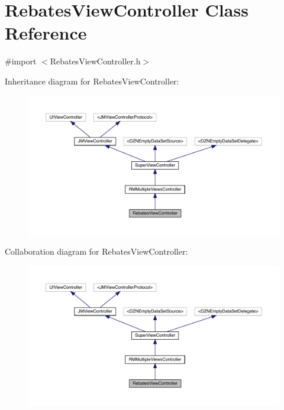\hypertarget{interface_rebates_view_controller}{}\section{Rebates\+View\+Controller Class Reference}
\label{interface_rebates_view_controller}


{\ttfamily \#import $<$Rebates\+View\+Controller.\+h$>$}



Inheritance diagram for Rebates\+View\+Controller\+:\nopagebreak
\begin{figure}[H]
\begin{center}
\leavevmode
\includegraphics[width=350pt]{interface_rebates_view_controller__inherit__graph}
\end{center}
\end{figure}


Collaboration diagram for Rebates\+View\+Controller\+:\nopagebreak
\begin{figure}[H]
\begin{center}
\leavevmode
\includegraphics[width=350pt]{interface_rebates_view_controller__coll__graph}
\end{center}
\end{figure}

